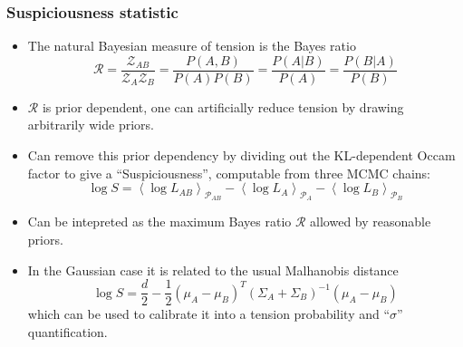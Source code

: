 \documentclass[aspectratio=169]{beamer}
\newcommand{\mean}[2][]{\left\langle#2\right\rangle_{#1}}
\begin{document}
\begin{frame}
    \frametitle{Suspiciousness statistic  }

    \begin{itemize}
        \item The natural Bayesian measure of tension is the Bayes ratio
            \begin{equation}
                \mathcal{R} = \frac{\mathcal{Z}_{AB}}{\mathcal{Z}_A\mathcal{Z}_B} = \frac{P(A,B)}{P(A)P(B)} = \frac{P(A|B)}{P(A)}= \frac{P(B|A)}{P(B)}
            \end{equation}
        \item $\mathcal{R}$ is prior dependent, one can artificially reduce tension by drawing arbitrarily wide priors.
        \item Can remove this prior dependency by dividing out the KL-dependent Occam factor to give a ``Suspiciousness'', computable from three MCMC chains:
            \begin{equation}
                \log S = \mean[\mathcal{P}_{AB}]{\log L_{AB}} - \mean[\mathcal{P}_{A}]{\log L_{A}}- \mean[\mathcal{P}_{B}]{\log L_{B}}
            \end{equation}
        \item Can be intepreted as the maximum Bayes ratio $\mathcal{R}$ allowed by reasonable priors.
        \item In the Gaussian case it is related to the usual Malhanobis distance
            \begin{equation}
                \log S = \frac{d}{2} - \frac{1}{2}(\mu_A-\mu_B)^T(\Sigma_A+\Sigma_B)^{-1}(\mu_A-\mu_B) 
            \end{equation}
            which can be used to calibrate it into a tension probability and ``$\sigma$'' quantification.
    \end{itemize}
\end{frame}
\end{document}
